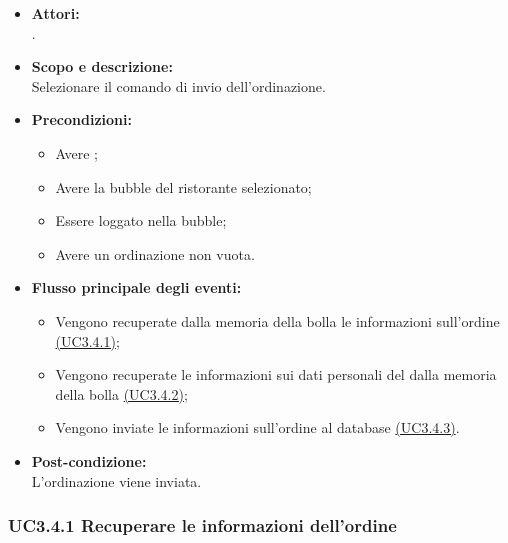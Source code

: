 \begin{itemize}
	\item \textbf{Attori:}
	\\.
	\item \textbf{Scopo e descrizione:} 
	\\Selezionare il comando di invio dell’ordinazione.
	\item \textbf{Precondizioni:}
	\begin{itemize}
		\item Avere ;
		\item Avere la bubble del ristorante selezionato;
		\item Essere loggato nella bubble;
		\item Avere un ordinazione non vuota.
	\end{itemize}
	\item \textbf{Flusso principale degli eventi:}
	\begin{itemize}
		\item Vengono recuperate dalla memoria della bolla le informazioni sull’ordine \hyperref[UC3.4.1]{(UC3.4.1)};
		\item Vengono recuperate le informazioni sui dati personali del  dalla memoria della bolla \hyperref[UC3.4.2]{(UC3.4.2)};
		\item Vengono inviate le informazioni sull’ordine al database \hyperref[UC3.4.3]{(UC3.4.3)}.
	\end{itemize}
	\item \textbf{Post-condizione:}
	\\L’ordinazione viene inviata.
\end{itemize}

\subsubsection{UC3.4.1 Recuperare le informazioni dell’ordine} \label{UC3.4.1}

